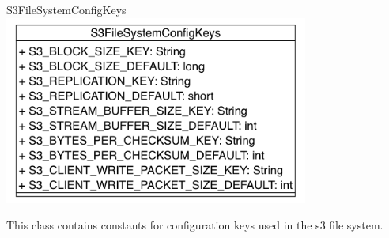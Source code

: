 \begin{XeClass}{S3FileSystemConfigKeys}
\includegraphics[width=10cm]{cdig/S3FileSystemConfigKeys.png}
     
 This class contains constants for configuration keys used
 in the s3 file system. 

\end{XeClass}
